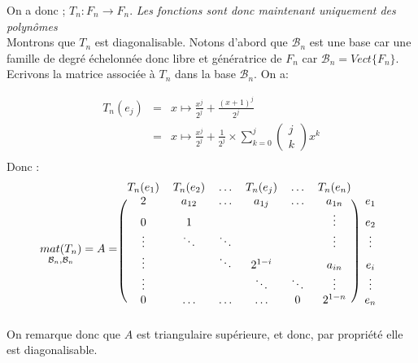 On a donc ; $T_n : F_n \rightarrow F_n$. \textit{Les fonctions sont donc maintenant uniquement des polynômes}\\
Montrons que $T_n$ est diagonalisable.
Notons d'abord que $\mathcal{B}_n$ est une base car une famille de degré échelonnée donc libre et génératrice de $F_n$ car $\mathcal{B}_n = Vect\{F_n\}$.
Ecrivons la matrice associée à $T_n$ dans la base $\mathcal{B}_n$. On a:

\[
  \begin{array}{rcl}
    T_{n}(e_j) & = & x \mapsto \frac{x^j}{2^j} + \frac{(x+1)^j}{2^j}  \\
               & = & x \mapsto \frac{x^j}{2^j} + \frac{1}{2^j} \times
    \sum\limits_{k=0}^{j}
    \left(
    \begin{array}{c}
        j \\
        k
      \end{array}
    \right) x^k
    \\
  \end{array}
\]
Donc :
\[
  \underset{\mathcal{B}_n, \mathcal{B}_n}{mat(T_n)} = A =
  \begin{blockarray}{ccccccc}
    T_n(e_1) & T_n(e_2) & \dots &T_n(e_j) & \dots & T_n(e_n) \\
    \begin{block}{(cccccc)c}
      2       & a_{12}  & \dots   & a_{1j}  & \dots   & a_{1n}  & e_1     \\
      0       & 1       & ~       & ~       & ~       & \vdots  & e_2     \\
      \vdots  & \ddots  & \ddots  & ~       & ~       & \vdots  & \vdots  \\
      \vdots  & ~       & \ddots  & 2^{1-i} & ~       & a_{in}  & e_i     \\
      \vdots  & ~       & ~       & \ddots  & \ddots  & \vdots  & \vdots  \\
      0       & \dots   & \dots   & \dots   & 0       & 2^{1-n} &  e_n    \\
    \end{block}
  \end{blockarray}
\] On remarque donc que $A$ est triangulaire supérieure, et donc, par propriété elle est diagonalisable.
